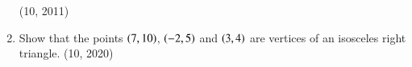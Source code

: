 \begin{enumerate}[label=\thesubsection.\arabic*, ref=\thesubsection.\theenumi]
\hfill (10, 2011)
\item Show that the points $\left(7, 10\right)$, $\left(-2, 5\right)$ and $\left(3, 4\right)$ are vertices of an isosceles right triangle.
\hfill (10, 2020)
\end{enumerate}

